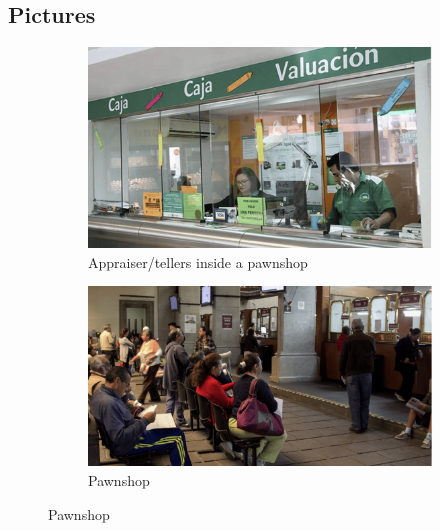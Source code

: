 \newpage



\section{ }
\vspace{.2in}




\vspace{.1in}

\subsection{Pictures}

\begin{figure}[H]
     \caption{Some Pawnshops}
    \label{PawnshopPicture}
    \begin{center}
    \begin{subfigure}{0.42\textwidth}
    \caption{Appraiser/tellers inside a pawnshop}
        \centering
        \includegraphics[width=\textwidth]{Figuras/empenio9_.png}
    \end{subfigure}
        \begin{subfigure}{0.45\textwidth}
    \caption{Pawnshop}
        \centering
        \includegraphics[width=\textwidth]{Figuras/empenio11_.png}
    \end{subfigure}
    

\end{center}
\end{figure}
